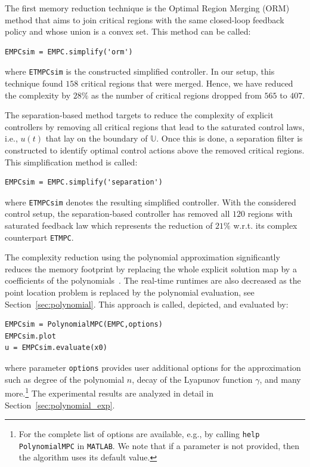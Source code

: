 \documentclass[letterpaper, 10 pt, conference]{ieeeconf}
\newcommand{\polydegree}{n}
\begin{document}
The first memory reduction technique is the Optimal Region Merging (ORM) method that aims to join critical regions with the same closed-loop feedback policy and whose union is a convex set. This method can be called: 
\begin{verbatim}
EMPCsim = EMPC.simplify('orm')
\end{verbatim}
where \verb|ETMPCsim| is the constructed simplified controller. In our setup, this technique found $158$ critical regions that were merged. Hence, we have reduced the complexity by $28\%$ as the number of critical regions dropped from $565$ to $407$. 

%
%
The separation-based method targets to reduce the complexity of explicit controllers by removing all critical regions that lead to the saturated control laws, i.e., $u(t)$ that lay on the boundary of $\mathbb{U}$. Once this is done, a separation filter is constructed to identify optimal control actions above the removed critical regions. This simplification method is called:
\begin{verbatim}
EMPCsim = EMPC.simplify('separation')
\end{verbatim}
where \verb|ETMPCsim| denotes the resulting simplified controller. With the considered control setup, the separation-based controller has removed all $120$ regions with saturated feedback law which represents the reduction of $21\%$ w.r.t. its complex counterpart \verb|ETMPC|.

The complexity reduction using the polynomial approximation significantly reduces the memory footprint by replacing the whole explicit solution map by a coefficients of the polynomials~\cite{KL11}. The real-time runtimes are also decreased as the point location problem is replaced by the polynomial evaluation, see Section~\ref{sec:polynomial}. This approach is called, depicted, and evaluated by:
\begin{verbatim}
EMPCsim = PolynomialMPC(EMPC,options)
EMPCsim.plot
u = EMPCsim.evaluate(x0)
\end{verbatim}
where parameter \verb|options| provides user additional options for the approximation such as degree of the polynomial $\polydegree$, decay of the Lyapunov function $\gamma$, and many more.\footnote{For the complete list of options are available, e.g., by calling \texttt{help PolynomialMPC} in \texttt{MATLAB}. We note that if a parameter is not provided, then the algorithm uses its default value.}
The experimental results are analyzed in detail in Section~\ref{sec:polynomial_exp}.
\end{document}
